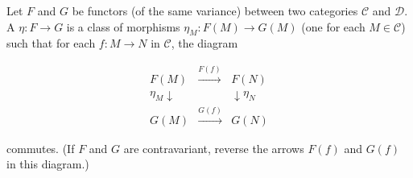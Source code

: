 Let $F$ and $G$ be functors (of the same variance) between two categories $\mathcal{C}$ and $\mathcal{D}$. A  $\eta: F \to G$ is a class of morphisms $\eta_M: F(M) \to G(M)$ (one for each $M \in \mathcal{C}$) such that for each $f: M \to N$ in $\mathcal{C}$, the diagram

$$\begin{array}{ccc}
F(M) & \xrightarrow{F(f)} & F(N) \\
{\scriptstyle \eta_M}\downarrow & & \downarrow{\scriptstyle \eta_N} \\
G(M) & \xrightarrow{G(f)} & G(N)
\end{array}$$

commutes. (If $F$ and $G$ are contravariant, reverse the arrows $F(f)$ and $G(f)$ in this diagram.)
